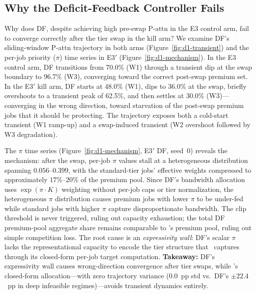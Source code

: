 \subsection{Why the Deficit-Feedback Controller Fails}
\label{sec:eq4}

Why does DF, despite achieving high pre-swap P-attn in the E3 control arm, fail to converge correctly after the tier swap in the kill arm? We examine DF's sliding-window P-attn trajectory in both arms (Figure~\ref{fig:d1-transient}) and the per-job priority ($\pi$) time series in E3$'$ (Figure~\ref{fig:d1-mechanism}). In the E3 control arm, DF transitions from 70.0\% (W1) through a transient dip at the swap boundary to 96.7\% (W3), converging toward the correct post-swap premium set. In the E3$'$ kill arm, DF starts at 48.0\% (W1), dips to 36.0\% at the swap, briefly overshoots to a transient peak of 62.5\%, and then settles at 30.0\% (W3)---converging in the wrong direction, toward starvation of the post-swap premium jobs that it should be protecting. The trajectory exposes both a cold-start transient (W1 ramp-up) and a swap-induced transient (W2 overshoot followed by W3 degradation).

The $\pi$ time series (Figure~\ref{fig:d1-mechanism}, E3$'$ DF, seed~0) reveals the mechanism: after the swap, per-job $\pi$ values stall at a heterogeneous distribution spanning $0.056$--$0.399$, with the standard-tier jobs' effective weights compressed to approximately $17\%$--$20\%$ of the premium pool. Since DF's bandwidth allocation uses $\exp(\pi\cdot K)$ weighting without per-job caps or tier normalization, the heterogeneous $\pi$ distribution causes premium jobs with lower $\pi$ to be under-fed while standard jobs with higher $\pi$ capture disproportionate bandwidth. The clip threshold is never triggered, ruling out capacity exhaustion; the total DF premium-pool aggregate share remains comparable to \Name's premium pool, ruling out simple competition loss. The root cause is an \emph{expressivity wall}: DF's scalar $\pi$ lacks the representational capacity to encode the tier structure that \Name\ captures through its closed-form per-job target computation. \textbf{Takeaway:} DF's expressivity wall causes wrong-direction convergence after tier swaps, while \Name's closed-form allocation---with zero trajectory variance ($0.0$~pp std vs.\ DF's $\pm22.4$~pp in deep infeasible regimes)---avoids transient dynamics entirely.

